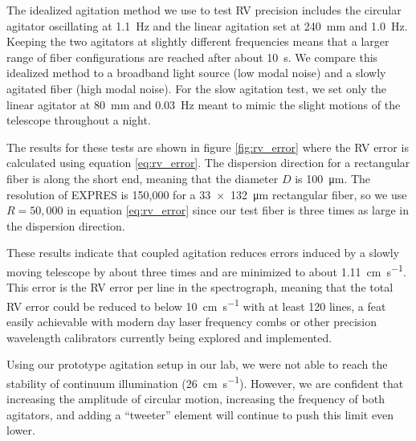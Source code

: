 \documentclass[twocolumn]{emulateapj}
\begin{document}
The idealized agitation method we use to test RV precision includes the circular agitator oscillating at \SI{1.1}{\hertz} and the linear agitation set at \SI{240}{\milli\meter} and \SI{1.0}{\hertz}. Keeping the two agitators at slightly different frequencies means that a larger range of fiber configurations are reached after about \SI{10}{\second}. We compare this idealized method to a broadband light source (low modal noise) and a slowly agitated fiber (high modal noise). For the slow agitation test, we set only the linear agitator at \SI{80}{\milli\meter} and \SI{0.03}{\hertz} meant to mimic the slight motions of the telescope throughout a night.

The results for these tests are shown in figure \ref{fig:rv_error} where the RV error is calculated using equation \ref{eq:rv_error}. The dispersion direction for a rectangular fiber is along the short end, meaning that the diameter $D$ is \SI{100}{\micro\meter}. The resolution of EXPRES is 150,000 for a \SI{33x132}{\micro\meter} rectangular fiber, so we use $R=50,000$ in equation \ref{eq:rv_error} since our test fiber is three times as large in the dispersion direction.


These results indicate that coupled agitation reduces errors induced by a slowly moving telescope by about three times and are minimized to about \SI{1.11}{\centi\meter\per\second}. This error is the RV error per line in the spectrograph, meaning that the total RV error could be reduced to below \SI{10}{\centi\meter\per\second} with at least 120 lines, a feat easily achievable with modern day laser frequency combs or other precision wavelength calibrators currently being explored and implemented.

Using our prototype agitation setup in our lab, we were not able to reach the stability of continuum illumination (\SI{26}{\centi\meter\per\second}). However, we are confident that increasing the amplitude of circular motion, increasing the frequency of both agitators, and adding a ``tweeter'' element will continue to push this limit even lower.
\end{document}
